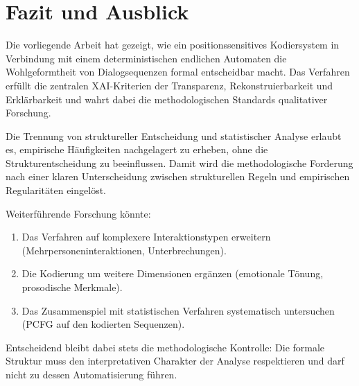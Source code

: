 \documentclass[
  12pt,
  a4paper,
  oneside,
  titlepage
]{article}
\begin{document}
\section{Fazit und Ausblick}

Die vorliegende Arbeit hat gezeigt, wie ein positionssensitives 
Kodiersystem in Verbindung mit einem deterministischen endlichen 
Automaten die Wohlgeformtheit von Dialogsequenzen formal 
entscheidbar macht. Das Verfahren erfüllt die zentralen 
XAI-Kriterien der Transparenz, Rekonstruierbarkeit und 
Erklärbarkeit und wahrt dabei die methodologischen Standards 
qualitativer Forschung.

Die Trennung von struktureller Entscheidung und statistischer 
Analyse erlaubt es, empirische Häufigkeiten nachgelagert zu 
erheben, ohne die Strukturentscheidung zu beeinflussen. Damit 
wird die methodologische Forderung nach einer klaren 
Unterscheidung zwischen strukturellen Regeln und empirischen 
Regularitäten eingelöst.

Weiterführende Forschung könnte:

\begin{enumerate}
    \item Das Verfahren auf komplexere Interaktionstypen 
    erweitern (Mehrpersoneninteraktionen, Unterbrechungen).
    
    \item Die Kodierung um weitere Dimensionen ergänzen 
    (emotionale Tönung, prosodische Merkmale).
    
    \item Das Zusammenspiel mit statistischen Verfahren 
    systematisch untersuchen (PCFG auf den kodierten Sequenzen).
\end{enumerate}

Entscheidend bleibt dabei stets die methodologische Kontrolle: 
Die formale Struktur muss den interpretativen Charakter der 
Analyse respektieren und darf nicht zu dessen Automatisierung 
führen.
\end{document}
